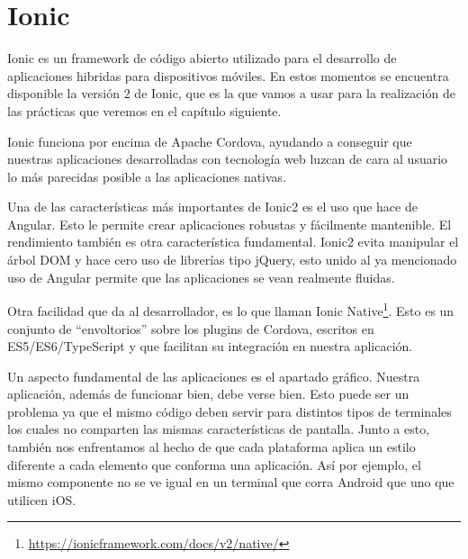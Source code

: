 \section{Ionic}

Ionic es un framework de código abierto utilizado para el desarrollo de aplicaciones hibridas para dispositivos móviles. En estos momentos se encuentra disponible la versión 2 de Ionic, que es la que vamos a usar para la realización de las prácticas que veremos en el capítulo siguiente.

Ionic funciona por encima de Apache Cordova, ayudando a conseguir que nuestras aplicaciones desarrolladas con tecnología web luzcan de cara al usuario lo más parecidas posible a las aplicaciones nativas.

Una de las características más importantes de Ionic2 es el uso que hace de Angular. Esto le permite crear aplicaciones robustas y fácilmente mantenible. El rendimiento también es otra característica fundamental. Ionic2 evita manipular el árbol DOM y hace cero uso de librerías tipo jQuery, esto unido al ya mencionado uso de Angular permite que las aplicaciones se vean realmente fluidas.

Otra facilidad que da al desarrollador, es lo que llaman Ionic Native\footnote{\url{https://ionicframework.com/docs/v2/native/}}. Esto es un conjunto de ``envoltorios'' sobre los plugins de Cordova, escritos en ES5/ES6/TypeScript y que facilitan su integración en nuestra aplicación.

Un aspecto fundamental de las aplicaciones es el apartado gráfico. Nuestra aplicación, además de funcionar bien, debe verse bien. Esto puede ser un problema ya que el mismo código deben servir para distintos tipos de terminales los cuales no comparten las mismas características de pantalla. Junto a esto, también nos enfrentamos al hecho de que cada plataforma aplica un estilo diferente a cada elemento que conforma una aplicación. Así por ejemplo, el mismo componente no se ve igual en un terminal que corra Android que uno que utilicen iOS.

